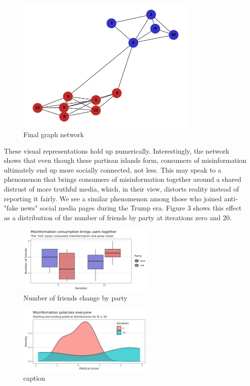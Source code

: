 \documentclass[titlepage, 12pt, leqno]{article}
\begin{document}
\begin{figure}[ht]
    \centering
    \includegraphics[width=0.8\textwidth]{../plots/graph_iter21.png}
    \caption{Final graph network}
\end{figure}


These visual representations hold up numerically. Interestingly, the network shows that even though these partisan islands form, consumers of misinformation ultimately end up more socially connected, not less. This may speak to a phenomenon that brings consumers of misinformation together around a shared distrust of more truthful media, which, in their view, distorts reality instead of reporting it fairly. We see a similar phenomenon among those who joined anti-"fake news" social media pages during the Trump era. Figure 3 shows this effect as a distribution of the number of friends by party at iterations zero and 20.

\begin{figure}[ht]
    \centering
    \includegraphics[width=0.6\textwidth]{../plots/nfriends_change.png}
    \caption{Number of friends change by party}
\end{figure}

\begin{figure}[ht]
    \centering
    \includegraphics[width=0.6\textwidth]{../plots/polscore_change.png}
    \caption{caption}
\end{figure}
\end{document}
